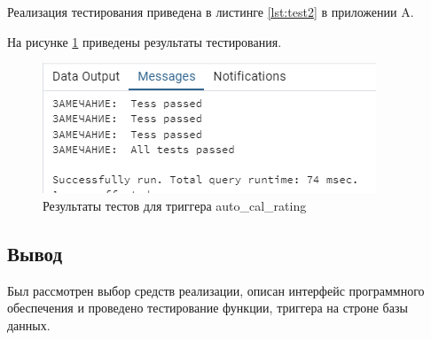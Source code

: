 Реализация тестирования приведена в листинге \ref{lst:test2} в приложении A.

На рисунке \ref{img:testtrigger} приведены результаты тестирования.
\begin{figure}[h]
	\centering
	\includegraphics[height=0.2\textheight]{img/testtrigger.png}
	\caption{Результаты тестов для триггера auto\_cal\_rating}
	\label{img:testtrigger}
\end{figure}
\subsection*{Вывод}
Был рассмотрен выбор средств реализации, описан интерфейс программного обеспечения и проведено тестирование функции, триггера на строне базы данных.
